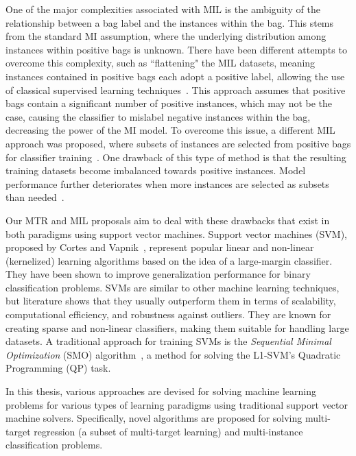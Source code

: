 \documentclass[reqno]{vcuthesis}
\numberwithin{equation}{chapter}
\begin{document}
One of the major complexities associated with MIL is the ambiguity of the relationship between a bag label and the instances within the bag. This stems from the standard MI assumption, where the underlying distribution among instances within positive bags is unknown. There have been different attempts to overcome this complexity, such as ``flattening" the MIL datasets, meaning instances contained in positive bags each adopt a positive label, allowing the use of classical supervised learning techniques~\cite{Ray2005}. This approach assumes that positive bags contain a significant number of positive instances, which may not be the case, causing the classifier to mislabel negative instances within the bag, decreasing the power of the MI model. To overcome this issue, a different MIL approach was proposed, where subsets of instances are selected from positive bags for classifier training~\cite{Maron1998}. One drawback of this type of method is that the resulting training datasets become imbalanced towards positive instances. Model performance further deteriorates when more instances are selected as subsets than needed~\cite{Carbonneau2016}. 

Our MTR and MIL proposals aim to deal with these drawbacks that exist in both paradigms using support vector machines. Support vector machines (SVM), proposed by Cortes and Vapnik~\cite{Cortes1995}, represent popular linear and non-linear (kernelized) learning algorithms based on the idea of a large-margin classifier. They have been shown to improve generalization performance for binary classification problems. SVMs are similar to other machine learning techniques, but literature shows that they usually outperform them in terms of scalability, computational efficiency, and robustness against outliers. They are known for creating sparse and non-linear classifiers, making them suitable for handling large datasets. A traditional approach for training SVMs is the \textit{Sequential Minimal Optimization} (SMO) algorithm~\cite{Platt1998}, a method for solving the L1-SVM's Quadratic Programming (QP) task. 

In this thesis, various approaches are devised for solving machine learning problems for various types of learning paradigms using traditional support vector machine solvers. Specifically, novel algorithms are proposed for solving multi-target regression (a subset of multi-target learning) and multi-instance classification problems. 
\end{document}
